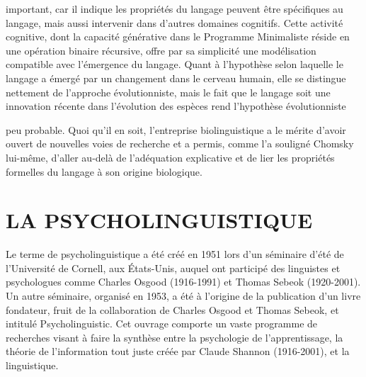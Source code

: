 important, car il indique les propriétés du langage peuvent être spécifiques au langage, mais
aussi intervenir dans d’autres domaines cognitifs.
Cette activité cognitive, dont la capacité générative dans le Programme Minimaliste réside en une
opération binaire récursive, offre par sa simplicité une modélisation compatible avec l'émergence
du langage. Quant à l'hypothèse selon laquelle le langage a émergé par un changement dans
le cerveau humain, elle se distingue nettement de l'approche évolutionniste, mais le fait que le
langage soit une innovation récente dans l'évolution des espèces rend l'hypothèse évolutionniste

peu probable. Quoi qu'il en soit, l’entreprise biolinguistique a le mérite d'avoir ouvert de nouvelles
voies de recherche et a permis, comme l’a souligné Chomsky lui-même, d'aller au-delà de
l'adéquation explicative et de lier les propriétés formelles du langage à son origine biologique.
\section{LA PSYCHOLINGUISTIQUE}
Le terme de psycholinguistique a été créé en 1951 lors d’un séminaire d'été de l’Université de Cornell, aux
États-Unis, auquel ont participé des linguistes et psychologues comme Charles Osgood (1916-1991) et
Thomas Sebeok (1920-2001). Un autre séminaire, organisé en 1953, a été à l’origine de la publication d’un
livre fondateur, fruit de la collaboration de Charles Osgood et Thomas Sebeok, et intitulé Psycholinguistic.
Cet ouvrage comporte un vaste programme de recherches visant à faire la synthèse entre la psychologie
de l'apprentissage, la théorie de l'information tout juste créée par Claude Shannon (1916-2001), et la
linguistique.
